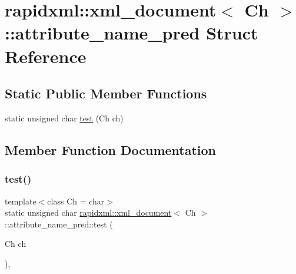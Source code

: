 \hypertarget{structrapidxml_1_1xml__document_1_1attribute__name__pred}{}\section{rapidxml\+::xml\+\_\+document$<$ Ch $>$\+::attribute\+\_\+name\+\_\+pred Struct Reference}
\label{structrapidxml_1_1xml__document_1_1attribute__name__pred}
\subsection*{Static Public Member Functions}
\begin{DoxyCompactItemize}
\item 
static unsigned char \mbox{\hyperlink{structrapidxml_1_1xml__document_1_1attribute__name__pred_a2cf003483847dfabcf0c83877818a4c5}{test}} (Ch ch)
\end{DoxyCompactItemize}


\subsection{Member Function Documentation}
\mbox{\label{structrapidxml_1_1xml__document_1_1attribute__name__pred_a2cf003483847dfabcf0c83877818a4c5}} 
\subsubsection{\texorpdfstring{test()}{test()}}
{\footnotesize\ttfamily template$<$class Ch = char$>$ \\
static unsigned char \mbox{\hyperlink{classrapidxml_1_1xml__document}{rapidxml\+::xml\+\_\+document}}$<$ Ch $>$\+::attribute\+\_\+name\+\_\+pred\+::test (\begin{DoxyParamCaption}\item[{Ch}]{ch }\end{DoxyParamCaption})\hspace{0.3cm}{\ttfamily [inline]}, {\ttfamily [static]}}

